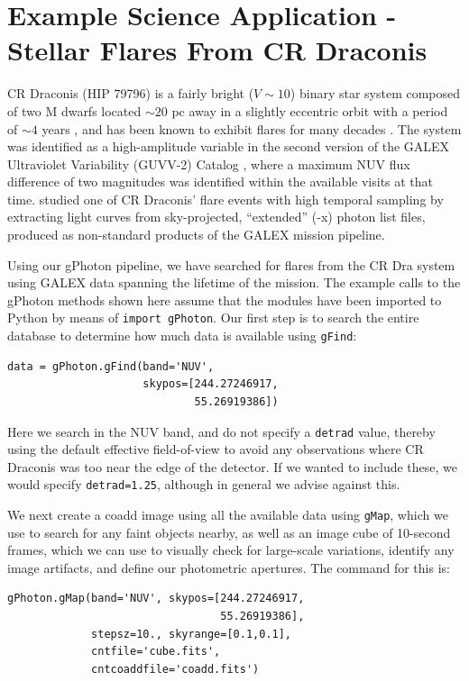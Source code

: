 \documentclass[iop]{emulateapj}
\begin{document}
\section{Example Science Application - Stellar Flares From CR Draconis}
\label{scienceexamples}
CR Draconis (HIP 79796) is a fairly bright ($V \sim 10$) binary star system composed of two M dwarfs located $\sim 20$ pc away in a slightly eccentric orbit with a period of $\sim 4$ years \citep{tam2008}, and has been known to exhibit flares for many decades \citep{cri1970}. The system was identified as a high-amplitude variable in the second version of the GALEX Ultraviolet Variability (GUVV-2) Catalog \citep{whe2008}, where a maximum NUV flux difference of two magnitudes was identified within the available visits at that time. \citet{wel2006} studied one of CR Draconis' flare events with high temporal sampling by extracting light curves from sky-projected, ``extended'' (-x) photon list files, produced as non-standard products of the GALEX mission pipeline.

Using our gPhoton pipeline, we have searched for flares from the CR Dra system using GALEX data spanning the lifetime of the mission. The example calls to the gPhoton methods shown here assume that the modules have been imported to Python by means of \texttt{import gPhoton}. Our first step is to search the entire database to determine how much data is available using \texttt{gFind}:

\begin{verbatim}
data = gPhoton.gFind(band='NUV',
                     skypos=[244.27246917,
                             55.26919386])
\end{verbatim}

Here we search in the NUV band, and do not specify a \texttt{detrad} value, thereby using the default effective field-of-view to avoid any observations where CR Draconis was too near the edge of the detector.  If we wanted to include these, we would specify \texttt{detrad=1.25}, although in general we advise against this.

We next create a coadd image using all the available data using \texttt{gMap}, which we use to search for any faint objects nearby, as well as an image cube of 10-second frames, which we can use to visually check for large-scale variations, identify any image artifacts, and define our photometric apertures.  The command for this is:

\begin{verbatim}
gPhoton.gMap(band='NUV', skypos=[244.27246917,
                                 55.26919386],
             stepsz=10., skyrange=[0.1,0.1],
             cntfile='cube.fits',
             cntcoaddfile='coadd.fits')
\end{verbatim}
\end{document}
